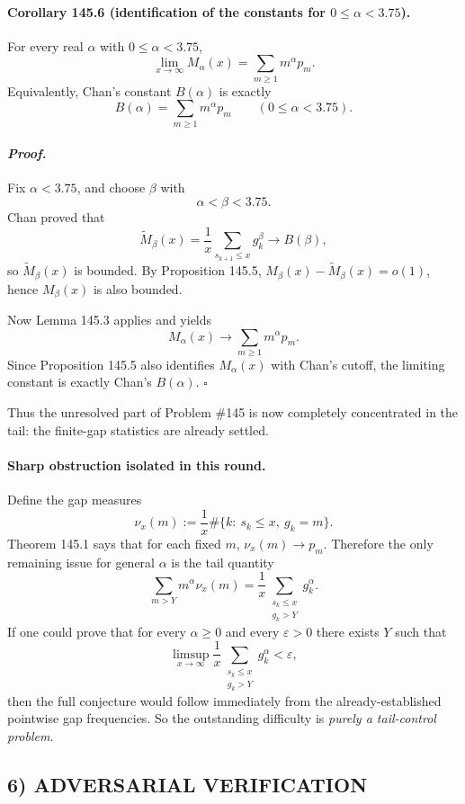 \paragraph{\textbf{Corollary 145.6 (identification of the constants for $0\le \alpha<3.75$).}}
For every real $\alpha$ with $0\le \alpha<3.75$,
\[
\lim_{x\to\infty} M_\alpha(x)
=
\sum_{m\ge 1} m^\alpha p_m.
\]
Equivalently, Chan's constant $B(\alpha)$ is exactly
\[
B(\alpha)=\sum_{m\ge 1} m^\alpha p_m
\qquad (0\le \alpha<3.75).
\]

\paragraph{\textit{Proof.}}
Fix $\alpha<3.75$, and choose $\beta$ with
\[
\alpha<\beta<3.75.
\]
Chan proved that
\[
\widetilde M_\beta(x)=\frac1x\sum_{s_{k+1}\le x} g_k^\beta \to B(\beta),
\]
so $\widetilde M_\beta(x)$ is bounded. By Proposition 145.5, $M_\beta(x)-\widetilde M_\beta(x)=o(1)$,
hence $M_\beta(x)$ is also bounded.

Now Lemma 145.3 applies and yields
\[
M_\alpha(x)\to \sum_{m\ge 1} m^\alpha p_m.
\]
Since Proposition 145.5 also identifies $M_\alpha(x)$ with Chan's cutoff, the limiting constant is
exactly Chan's $B(\alpha)$. \hfill $\square$

\medskip

Thus the unresolved part of Problem \#145 is now completely concentrated in the tail:
the finite-gap statistics are already settled.

\paragraph{\textbf{Sharp obstruction isolated in this round.}}
Define the gap measures
\[
\nu_x(m):=\frac1x\#\{k:\ s_k\le x,\ g_k=m\}.
\]
Theorem 145.1 says that for each fixed $m$, $\nu_x(m)\to p_m$.
Therefore the only remaining issue for general $\alpha$ is the tail quantity
\[
\sum_{m>Y} m^\alpha \nu_x(m)
=
\frac1x\sum_{\substack{s_k\le x\\ g_k>Y}} g_k^\alpha.
\]
If one could prove that for every $\alpha\ge 0$ and every $\varepsilon>0$ there exists $Y$ such that
\[
\limsup_{x\to\infty}
\frac1x\sum_{\substack{s_k\le x\\ g_k>Y}} g_k^\alpha
<\varepsilon,
\]
then the full conjecture would follow immediately from the already-established pointwise gap
frequencies. So the outstanding difficulty is \emph{purely a tail-control problem}.

\subsection*{6) ADVERSARIAL VERIFICATION}

